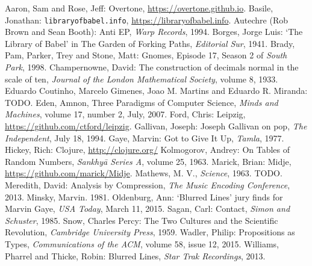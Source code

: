 \documentclass[numbers]{sigplanconf}
\begin{document}
\begin{thebibliography}{}
\softraggedright

 Aaron, Sam and Rose, Jeff: Overtone, \url{https://overtone.github.io}.
 Basile, Jonathan: \verb|libraryofbabel.info|, \url{https://libraryofbabel.info}.
 Autechre (Rob Brown and Sean Booth): Anti EP, \textit{Warp Records}, 1994.
 Borges, Jorge Luis: `The Library of Babel' in The Garden of Forking Paths, \textit{Editorial Sur}, 1941.
 Brady, Pam, Parker, Trey and Stone, Matt: Gnomes, Episode 17, Season 2 of \textit{South Park}, 1998.
 Champernowne, David: The construction of decimals normal in the scale of ten, \textit{Journal of the London Mathematical Society}, volume 8, 1933.
 Eduardo Coutinho, Marcelo Gimenes, Joao M. Martins and Eduardo R. Miranda: TODO. 
 Eden, Amnon, Three Paradigms of Computer Science, \textit{Minds and Machines}, volume 17, number 2, July, 2007.
 Ford, Chris: Leipzig, \url{https://github.com/ctford/leipzig}.
 Gallivan, Joseph: Joseph Gallivan on pop, \textit{The Independent}, July 18, 1994.
 Gaye, Marvin: Got to Give It Up, \textit{Tamla}, 1977.
 Hickey, Rich: Clojure, \url{http://clojure.org/}
  Kolmogorov, Andrey: On Tables of Random Numbers, \textit{Sankhyā Series A}, volume 25, 1963.
 Marick, Brian: Midje, \url{https://github.com/marick/Midje}.
 Mathews, M. V., \textit{Science}, 1963. TODO.
 Meredith, David: Analysis by Compression, \textit{The Music Encoding Conference}, 2013.
 Minsky, Marvin. 1981.
 Oldenburg, Ann: `Blurred Lines' jury finds for Marvin Gaye, \textit{USA Today}, March 11, 2015.
 Sagan, Carl: Contact, \textit{Simon and Schuster}, 1985.
 Snow, Charles Percy: The Two Cultures and the Scientific Revolution, \textit{Cambridge University Press}, 1959.
 Wadler, Philip: Propositions as Types, \textit{Communications of the ACM}, volume 58, issue 12, 2015.
 Williams, Pharrel and Thicke, Robin: Blurred Lines, \textit{Star Trak Recordings}, 2013.

\end{thebibliography}
\end{document}
